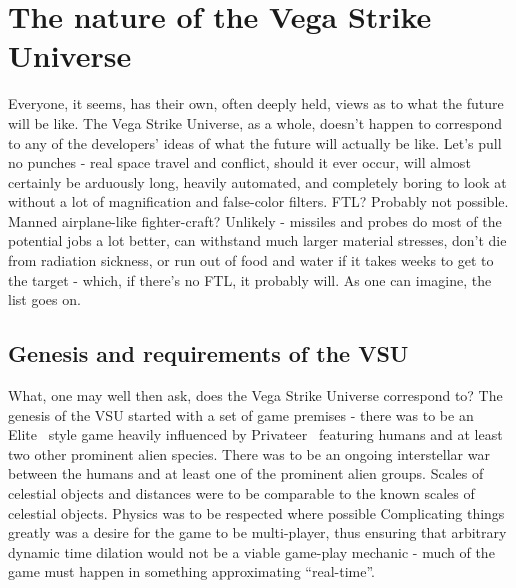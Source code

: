 \section{The nature of the Vega Strike Universe}
\label{sec:VSUflavor}
Everyone, it seems, has their own, often deeply held, views as to what
the future will be like. The Vega Strike Universe, as a whole, doesn't
happen to correspond to any of the developers' ideas of what the future
will actually be like. Let's pull no punches - real space travel and
conflict, should it ever occur, will almost certainly be arduously
long, heavily automated, and completely boring to look at without a
lot of magnification and false-color filters. FTL? Probably not
possible. Manned airplane-like fighter-craft? Unlikely - missiles and
probes do most of the potential jobs a lot better, can withstand much
larger material stresses, don't die from radiation sickness, or run
out of food and water if it takes weeks to get to the target - which,
if there's no FTL, it probably will. As one can imagine, the list goes
on.

\subsection{Genesis and requirements of the VSU}
What, one may well then ask, does the Vega Strike Universe correspond
to? The genesis of the VSU started with a set of game premises - there
was to be an Elite~\cite{Elite} style game heavily influenced by
Privateer~\cite{Privateer} featuring humans and at least two other
prominent alien species. There was to be an ongoing interstellar war
between the humans and at least one of the prominent alien
groups. Scales of celestial objects and distances were to be
comparable to the known scales of celestial objects. Physics was to be
respected where possible Complicating things greatly was a desire for
the game to be multi-player, thus ensuring that arbitrary dynamic time
dilation would not be a viable game-play mechanic - much of the game
must happen in something approximating ``real-time''.




\label{Danny's stuff goes here}




